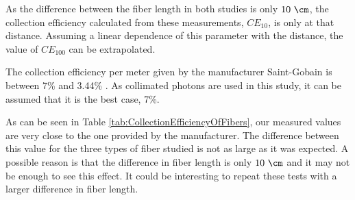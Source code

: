 As the difference between the fiber length in both studies is only $10~\cm$, the collection efficiency calculated from these measurements, $CE_{10}$, is only at that distance. Assuming a linear dependence of this parameter with the distance, the value of $CE_{100}$ can be extrapolated.

The collection efficiency per meter given by the manufacturer Saint-Gobain is between 7\% and 3.44\% \cite{DataSheetBCF12Fiber}. As collimated photons are used in this study, it can be assumed that it is the best case, 7\%. 

As can be seen in Table \ref{tab:CollectionEfficiencyOfFibers}, our measured values are very close to the one provided by the manufacturer. The difference between this value for the three types of fiber studied is not as large as it was expected. A possible reason is that the difference in fiber length is only $10~\cm$ and it may not be enough to see this effect. It could be interesting to repeat these tests with a larger difference in fiber length.